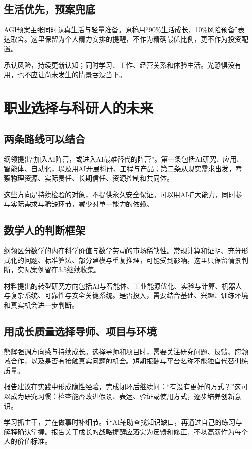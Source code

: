 \documentclass[UTF8,zihao=-4,fontset=fandol,oneside,openany]{ctexbook}
\begin{document}
\subsection*{生活优先，预案兜底}
AGI预案主张同时认真生活与轻量准备。原稿用“90\%生活成长、10\%风险预备”表达取舍\cite{agi}。这里保留为个人精力安排的提醒，不作为精确最优比例，更不作为投资配置。

承认风险，持续更新认知；同时学习、工作、经营关系和体验生活。光恐惧没有用，也不应让尚未发生的情景吞没当下。

\section{职业选择与科研人的未来}
\subsection*{两条路线可以结合}
纲领提出“加入AI阵营，或进入AI最难替代的阵营”。第一条包括AI研究、应用、智能体、自动化，以及用AI开展科研、工程与产品；第二条从现实需求出发，考察物理资源、实际责任、长期信任、资源控制和共同体\cite{principles}。

这些方向是持续检验的对象，不提供永久安全保证。可以用AI扩大能力，同时参与实际需求与稀缺环节，减少对单一能力的依赖。

\subsection*{数学人的判断框架}
纲领区分数学的内在科学价值与数学劳动的市场稀缺性。常规计算和证明、充分形式化的问题、标准算法、部分建模与重复推理，可能受到影响。这里只保留情景判断，实际案例留在3.5继续收集。

材料提出的转型研究方向包括AI与智能体、工业能源优化、实验与计算、机器人与复杂系统、可靠性与安全关键系统。是否投入，需要结合基础、兴趣、训练环境和真实机会进一步判断。

\subsection*{用成长质量选择导师、项目与环境}
熊辉强调方向感与持续成长。选择导师和项目时，需要关注研究问题、反馈、跨领域合作，以及是否有接触真实问题的机会。短期报酬与平台名称不能独自代替训练质量。

报告建议在实践中形成隐性经验，完成闭环后继续问：“有没有更好的方式？”这可以成为研究习惯：检查能否改进假设、表达、验证或使用方式，逐步培养创新意识。

学习抓主干，并在做事时补细节。让AI辅助查找知识缺口，再通过自己的练习与解释确认掌握。报告关于成长的战略提醒应落实为反馈和修正，不以高薪作为每个人的价值标准。
\end{document}
